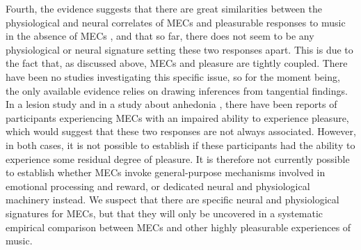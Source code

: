 Fourth, the evidence suggests that there are great similarities between the physiological and neural correlates of MECs and pleasurable responses to music in the absence of MECs \parencite[see][]{archie2013, koelsch2010, koelsch2014, salimpoor2011}, and that so far, there does not seem to be any physiological or neural signature setting these two responses apart. This is due to the fact that, as discussed above, MECs and pleasure are tightly coupled. There have been no studies investigating this specific issue, so for the moment being, the only available evidence relies on drawing inferences from tangential findings. In a lesion study \parencite{grunkina2017} and in a study about anhedonia \parencite{masherrero2014}, there have been reports of participants experiencing MECs with an impaired ability to experience pleasure, which would suggest that these two responses are not always associated. However, in both cases, it is not possible to establish if these participants had the ability to experience some residual degree of pleasure. It is therefore not currently possible to establish whether MECs invoke general-purpose mechanisms involved in emotional processing and reward, or dedicated neural and physiological machinery instead. We suspect that there are specific neural and physiological signatures for MECs, but that they will only be uncovered in a systematic empirical comparison between MECs and other highly pleasurable experiences of music.

